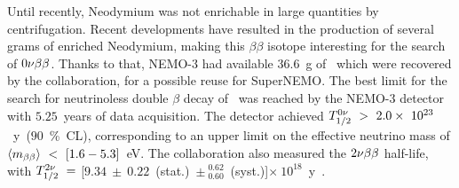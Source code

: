 Until recently, Neodymium was not enrichable in large quantities by centrifugation.
Recent developments have resulted in the production of several grams of enriched Neodymium, making this $\beta\beta$ isotope interesting for the search of $0\nu\beta\beta$.
Thanks to that, NEMO-$3$ had available $36.6$~g of \Nd\ which were recovered by the collaboration, for a possible reuse for SuperNEMO.
The best limit for the search for neutrinoless double $\beta$ decay of \Nd\ was reached by the NEMO-$3$ detector with $5.25$~years of data acquisition.
The detector achieved $T_{1/2}^{0\nu}~>~2.0\times~10^{23}$~y~($90$~\%~CL), corresponding to an upper limit on the effective neutrino mass of $\langle m_{\beta\beta}\rangle~<~[1.6-5.3]$~eV.
The collaboration also measured the $2\nu\beta\beta$ half-life, with $T_{1/2}^{2\nu}~=~$[$9.34~\pm~0.22$~(stat.)~$\pm~^{0.62}_{0.60}$~(syst.)]$\times~10^{18}$~y~\cite{art:NEMO3_Nd}.

